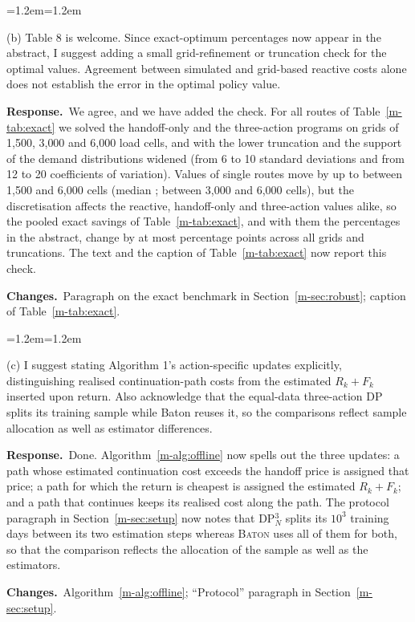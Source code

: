 \documentclass[11pt]{article}
\newenvironment{comment}{\par\medskip\noindent\color{rev}\itshape
  \begin{list}{}{\leftmargin=1.2em\rightmargin=1.2em}\item[]}%
  {\end{list}\par}
\newcommand{\resp}{\par\noindent\textbf{Response.}\ }
\newcommand{\chg}{\par\noindent\textbf{Changes.}\ }
\newcommand{\sref}[1]{Section~\ref{m-#1}}
\newcommand{\tref}[1]{Table~\ref{m-#1}}
\begin{document}
\begin{comment}
(b) Table 8 is welcome. Since exact-optimum percentages now appear in
the abstract, I suggest adding a small grid-refinement or truncation
check for the optimal values. Agreement between simulated and grid-based
reactive costs alone does not establish the error in the optimal policy
value.
\end{comment}
\resp We agree, and we have added the check. For all \gridRoutes{}
routes of \tref{tab:exact} we solved the handoff-only and the
three-action programs on grids of 1{,}500, 3{,}000 and 6{,}000 load cells,
and with the lower truncation and the support of the demand
distributions widened (from 6 to 10 standard deviations and from 12 to
20 coefficients of variation). Values of single routes move by up to \gridCoarseThreeMax{} between
1{,}500 and 6{,}000 cells (median \gridCoarseThreeMedian; \gridMidThreeMax{}
between 3{,}000 and 6{,}000 cells), but the discretisation affects the
reactive, handoff-only and three-action values alike, so the pooled
exact savings of \tref{tab:exact}, and with them the percentages in the
abstract, change by at most \gridPooledMaxDiff{} percentage points across
all grids and truncations. The text and the caption of \tref{tab:exact}
now report this check.
\chg Paragraph on the exact benchmark in \sref{sec:robust}; caption of
\tref{tab:exact}.

\begin{comment}
(c) I suggest stating Algorithm 1's action-specific updates explicitly,
distinguishing realised continuation-path costs from the estimated
$R_k + F_k$ inserted upon return. Also acknowledge that the equal-data
three-action DP splits its training sample while Baton reuses it, so the
comparisons reflect sample allocation as well as estimator differences.
\end{comment}
\resp Done. Algorithm~\ref{m-alg:offline} now spells out the three
updates: a path whose estimated continuation cost exceeds the handoff
price is assigned that price; a path for which the return is cheapest is
assigned the estimated $R_k + F_k$; and a path that continues keeps its
realised cost along the path. The protocol paragraph in \sref{sec:setup}
now notes that DP$^3_N$ splits its $10^3$ training days between its two
estimation steps whereas \textsc{Baton} uses all of them for both, so
that the comparison reflects the allocation of the sample as well as the
estimators.
\chg Algorithm~\ref{m-alg:offline}; ``Protocol'' paragraph in
\sref{sec:setup}.

\end{document}
